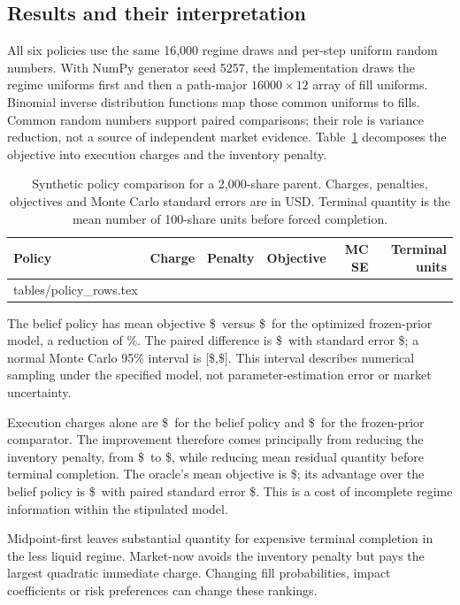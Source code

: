 \documentclass[11pt]{article}
\makeatletter
\numberwithin{equation}{section}
\theoremstyle{definition}
\theoremstyle{remark}
\theoremstyle{definition}
\newcommand{\inputtable}[1]{\@@input#1 }
\makeatother
\begin{document}
\subsection{Results and their interpretation}

All six policies use the same 16,000 regime draws and per-step uniform random
numbers. With NumPy generator seed 5257, the implementation draws the regime
uniforms first and then a path-major $16000\times12$ array of fill uniforms.
Binomial inverse distribution functions map those common uniforms to fills. Common random numbers support paired comparisons;
their role is variance reduction, not a source of independent market evidence.
Table~\ref{tab:policies} decomposes the objective into execution charges and
the inventory penalty.

\begin{table}[tb]
\centering\small
\caption{Synthetic policy comparison for a 2,000-share parent. Charges, penalties,
objectives and Monte Carlo standard errors are in USD. Terminal quantity is
the mean number of 100-share units before forced completion.}
\label{tab:policies}
\begin{tabular}{lrrrrr}
\toprule Policy & Charge & Penalty & Objective & MC SE & Terminal units \\\midrule
\inputtable{tables/policy_rows.tex}
\bottomrule
\end{tabular}
\end{table}

The belief policy has mean objective \$\BeliefObjective\ versus
\$\FrozenObjective\ for the optimized frozen-prior model, a reduction of
\ImprovementPct\%. The paired difference is \$\PairedDifference\ with
standard error \$\PairedSE; a normal Monte Carlo 95\% interval is
[\$\CILower,\$\CIUpper]. This interval describes numerical sampling under
the specified model, not parameter-estimation error or market uncertainty.

Execution charges alone are \$\BeliefCharge\ for the belief policy and
\$\FrozenCharge\ for the frozen-prior comparator. The improvement therefore
comes principally from reducing the inventory penalty, from
\$\FrozenPenalty\ to \$\BeliefPenalty, while reducing mean residual
quantity before terminal completion. The oracle's mean objective is
\$\OracleObjective; its advantage over the belief policy is \$\OracleGap\
with paired standard error \$\OracleGapSE. This is a cost of incomplete
regime information within the stipulated model.

Midpoint-first leaves substantial quantity for expensive terminal completion
in the less liquid regime. Market-now avoids the inventory penalty but pays
the largest quadratic immediate charge. Changing fill probabilities, impact
coefficients or risk preferences can change these rankings.
\end{document}
